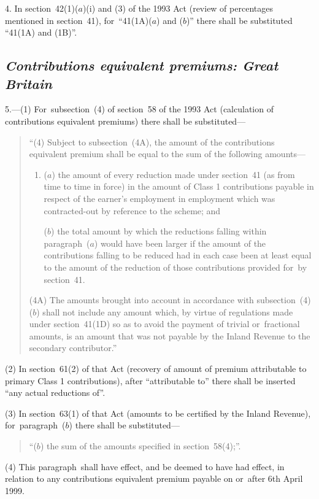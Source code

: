 \documentclass[12pt,a4paper]{article}
\begin{document}
4. In section~42(1)($a$)(i)  and (3)  of the 1993 Act (review of percentages mentioned in section~41), for~“41(1A)($a$)  and ($b$)” there shall be substituted “41(1A)  and (1B)”.

\subsection*{\itshape Contributions equivalent premiums: Great Britain}

5.---(1) For~subsection~(4)  of section~58 of the 1993 Act (calculation of contributions equivalent premiums) there shall be substituted—
\begin{quotation}
“(4) Subject to subsection~(4A), the amount of the contributions equivalent premium shall be equal to the sum of the following amounts—
\begin{enumerate}\item[]
($a$) the amount of every reduction made under section~41 (as from time to time in force) in the amount of Class 1 contributions payable in respect of the earner’s employment in employment which was contracted-out by reference to the scheme; and

($b$) the total amount by which the reductions falling within paragraph~($a$)  would have been larger if the amount of the contributions falling to be reduced had in each case been at least equal to the amount of the reduction of those contributions provided for~by section~41. 
\end{enumerate}

(4A) The amounts brought into account in accordance with subsection~(4)($b$)  shall not include any amount which, by virtue of regulations made under section~41(1D) so as to avoid the payment of trivial or~fractional amounts, is an amount that was not payable by the Inland Revenue to the secondary contributor.”
\end{quotation}

(2) In section~61(2)  of that Act (recovery of amount of premium attributable to primary Class 1 contributions), after “attributable to” there shall be inserted “any actual reductions of”.

(3) In section~63(1)  of that Act (amounts to be certified by the Inland Revenue), for~paragraph~($b$)  there shall be substituted—
\begin{quotation}
“($b$) the sum of the amounts specified in section~58(4);”.
\end{quotation}

(4) This paragraph~shall have effect, and be deemed to have had effect, in relation to any contributions equivalent premium payable on or~after 6th April 1999. 
\end{document}
